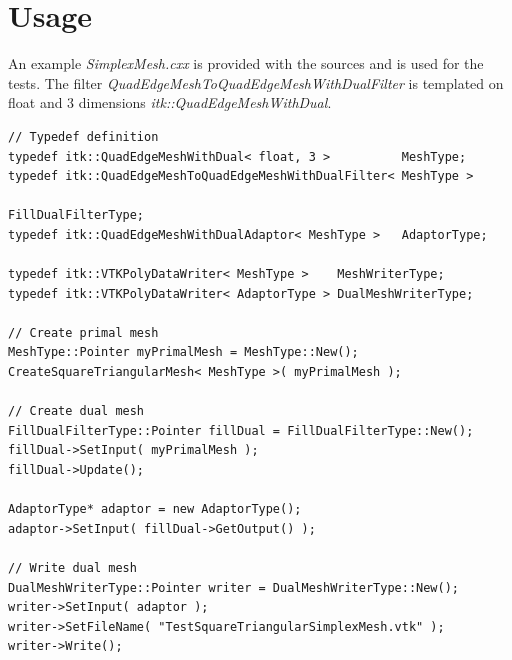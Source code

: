 \documentclass{InsightArticle}
\begin{document}
\section{Usage}
An example \emph{SimplexMesh.cxx} is provided with the sources and is used for the tests. The filter \emph{QuadEdgeMeshToQuadEdgeMeshWithDualFilter} is templated on float and 3 dimensions \emph{itk::QuadEdgeMeshWithDual}.
\begin{verbatim}
// Typedef definition
typedef itk::QuadEdgeMeshWithDual< float, 3 >          MeshType;
typedef itk::QuadEdgeMeshToQuadEdgeMeshWithDualFilter< MeshType >  
                                                       FillDualFilterType;
typedef itk::QuadEdgeMeshWithDualAdaptor< MeshType >   AdaptorType;

typedef itk::VTKPolyDataWriter< MeshType >    MeshWriterType;
typedef itk::VTKPolyDataWriter< AdaptorType > DualMeshWriterType;

// Create primal mesh
MeshType::Pointer myPrimalMesh = MeshType::New();
CreateSquareTriangularMesh< MeshType >( myPrimalMesh );

// Create dual mesh
FillDualFilterType::Pointer fillDual = FillDualFilterType::New();
fillDual->SetInput( myPrimalMesh );
fillDual->Update();

AdaptorType* adaptor = new AdaptorType();
adaptor->SetInput( fillDual->GetOutput() );

// Write dual mesh
DualMeshWriterType::Pointer writer = DualMeshWriterType::New();
writer->SetInput( adaptor );
writer->SetFileName( "TestSquareTriangularSimplexMesh.vtk" );
writer->Write();
\end{verbatim}




\end{document}
